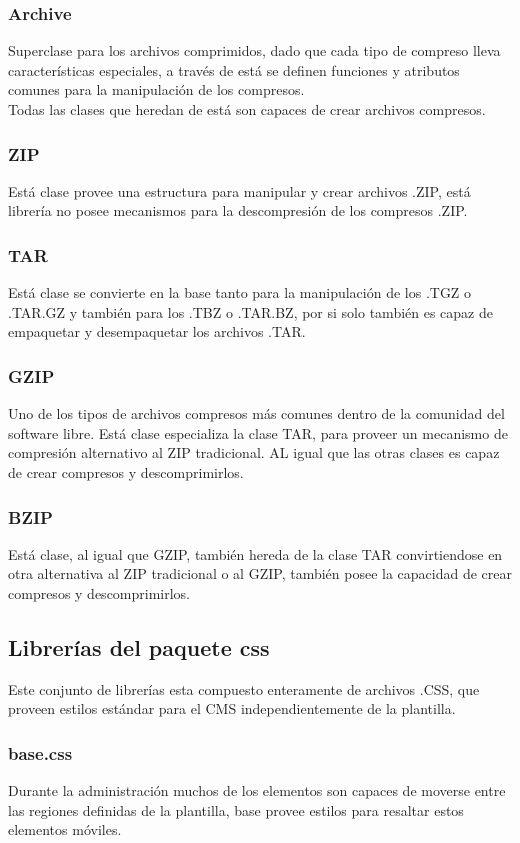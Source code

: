 \subsubsection{Archive}
Superclase para los archivos comprimidos, dado que cada tipo de compreso lleva caracter\'isticas especiales, a trav\'es de est\'a se definen funciones y atributos comunes para la manipulaci\'on de los compresos.\\Todas las clases que heredan de est\'a son capaces de crear archivos compresos.
\subsubsection{ZIP}
Est\'a clase provee una estructura para manipular y crear archivos .ZIP, est\'a librer\'ia no posee mecanismos para la descompresi\'on de los compresos .ZIP.
\subsubsection{TAR}
Est\'a clase se convierte en la base tanto para la manipulaci\'on de los .TGZ o .TAR.GZ y tambi\'en para los .TBZ o .TAR.BZ, por si solo tambi\'en es capaz de empaquetar y desempaquetar los archivos .TAR.
\subsubsection{GZIP}
Uno de los tipos de archivos compresos m\'as comunes dentro de la comunidad del software libre. Est\'a clase especializa la clase TAR, para proveer un mecanismo de compresi\'on alternativo al ZIP tradicional. AL igual que las otras clases es capaz de crear compresos y descomprimirlos.
\subsubsection{BZIP}
Est\'a clase, al igual que GZIP, tambi\'en hereda de la clase TAR convirtiendose en otra alternativa al ZIP tradicional o al GZIP, tambi\'en posee la capacidad de crear compresos y descomprimirlos.

\subsection{Librer\'ias del paquete \textsf{css}}
Este conjunto de librer\'ias esta compuesto enteramente de archivos .CSS, que proveen estilos est\'andar para el CMS independientemente de la plantilla.
\subsubsection{base.css}
Durante la administraci\'on muchos de los elementos son capaces de moverse entre las regiones definidas de la plantilla, \textsf{base} provee estilos para resaltar estos elementos m\'oviles.
